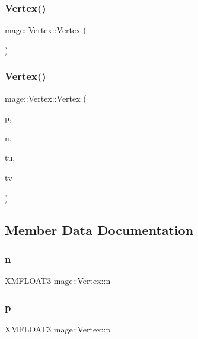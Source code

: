 \subsubsection{\texorpdfstring{Vertex()}{Vertex()}\hspace{0.1cm}{\footnotesize\ttfamily [1/2]}}
{\footnotesize\ttfamily mage\+::\+Vertex\+::\+Vertex (\begin{DoxyParamCaption}{ }\end{DoxyParamCaption})}

\hypertarget{structmage_1_1_vertex_a615029fe190db540ad0adb73b81ee8f5}{}\label{structmage_1_1_vertex_a615029fe190db540ad0adb73b81ee8f5} 
\subsubsection{\texorpdfstring{Vertex()}{Vertex()}\hspace{0.1cm}{\footnotesize\ttfamily [2/2]}}
{\footnotesize\ttfamily mage\+::\+Vertex\+::\+Vertex (\begin{DoxyParamCaption}\item[{X\+M\+F\+L\+O\+A\+T3}]{p,  }\item[{X\+M\+F\+L\+O\+A\+T3}]{n,  }\item[{float}]{tu,  }\item[{float}]{tv }\end{DoxyParamCaption})}



\subsection{Member Data Documentation}
\hypertarget{structmage_1_1_vertex_a0b6c65dd92ba473f490e790189d92daf}{}\label{structmage_1_1_vertex_a0b6c65dd92ba473f490e790189d92daf} 
\subsubsection{\texorpdfstring{n}{n}}
{\footnotesize\ttfamily X\+M\+F\+L\+O\+A\+T3 mage\+::\+Vertex\+::n}

\hypertarget{structmage_1_1_vertex_a9d726a508934b3baccfb01ea912420e7}{}\label{structmage_1_1_vertex_a9d726a508934b3baccfb01ea912420e7} 
\subsubsection{\texorpdfstring{p}{p}}
{\footnotesize\ttfamily X\+M\+F\+L\+O\+A\+T3 mage\+::\+Vertex\+::p}

